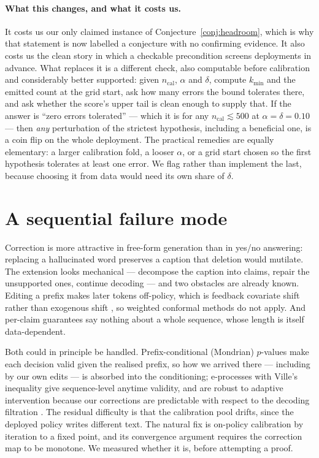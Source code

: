 \documentclass{article}
\theoremstyle{plain}
\theoremstyle{definition}
\theoremstyle{remark}
\begin{document}
\paragraph{What this changes, and what it costs us.}
It costs us our only claimed instance of Conjecture~\ref{conj:headroom}, which is why that
statement is now labelled a conjecture with no confirming evidence. It also costs us the clean
story in which a checkable precondition screens deployments in advance. What replaces it is a
different check, also computable before calibration and considerably better supported: given
$n_{\mathrm{cal}}$, $\alpha$ and $\delta$, compute $k_{\min}$ and the emitted count at the grid
start, ask how many errors the bound tolerates there, and ask whether the score's upper tail is
clean enough to supply that. If the answer is ``zero errors tolerated'' --- which it is for any
$n_{\mathrm{cal}}\lesssim500$ at $\alpha=\delta=0.10$ --- then \emph{any} perturbation of the
strictest hypothesis, including a beneficial one, is a coin flip on the whole deployment. The
practical remedies are equally elementary: a larger calibration fold, a looser $\alpha$, or a
grid start chosen so the first hypothesis tolerates at least one error. We flag rather than
implement the last, because choosing it from data would need its own share of $\delta$.

\section{A sequential failure mode}
\label{sec:sequential}

Correction is more attractive in free-form generation than in yes/no answering: replacing a
hallucinated word preserves a caption that deletion would mutilate. The extension looks
mechanical --- decompose the caption into claims, repair the unsupported ones, continue
decoding --- and two obstacles are already known. Editing a prefix makes later tokens
off-policy, which is feedback covariate shift rather than exogenous shift
\citep{fannjiang2022fcs}, so weighted conformal methods \citep{tibshirani2019} do not apply.
And per-claim guarantees say nothing about a whole sequence, whose length is itself
data-dependent.

Both could in principle be handled. Prefix-conditional (Mondrian) $p$-values make each
decision valid given the realised prefix, so how we arrived there --- including by our own
edits --- is absorbed into the conditioning; e-processes with Ville's inequality give
sequence-level anytime validity, and are robust to adaptive intervention because our
corrections are predictable with respect to the decoding filtration
\citep{waudbysmith2024,ramdas2023}. The residual difficulty is that the calibration pool
drifts, since the deployed policy writes different text. The natural fix is on-policy
calibration by iteration to a fixed point, and its convergence argument requires the
correction map to be monotone. We measured whether it is, before attempting a proof.
\end{document}
